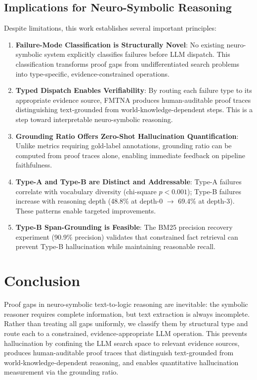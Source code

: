 \documentclass[11pt,letterpaper]{article}
\begin{document}
\subsection{Implications for Neuro-Symbolic Reasoning}

Despite limitations, this work establishes several important principles:

\begin{enumerate}
  \item \textbf{Failure-Mode Classification is Structurally Novel}: No existing neuro-symbolic system explicitly classifies failures before LLM dispatch. This classification transforms proof gaps from undifferentiated search problems into type-specific, evidence-constrained operations.

  \item \textbf{Typed Dispatch Enables Verifiability}: By routing each failure type to its appropriate evidence source, FMTNA produces human-auditable proof traces distinguishing text-grounded from world-knowledge-dependent steps. This is a step toward interpretable neuro-symbolic reasoning.

  \item \textbf{Grounding Ratio Offers Zero-Shot Hallucination Quantification}: Unlike metrics requiring gold-label annotations, grounding ratio can be computed from proof traces alone, enabling immediate feedback on pipeline faithfulness.

  \item \textbf{Type-A and Type-B are Distinct and Addressable}: Type-A failures correlate with vocabulary diversity (chi-square $p{<}0.001$); Type-B failures increase with reasoning depth (48.8\% at depth-0 $\to$ 69.4\% at depth-3). These patterns enable targeted improvements.

  \item \textbf{Type-B Span-Grounding is Feasible}: The BM25 precision recovery experiment (90.9\% precision) validates that constrained fact retrieval can prevent Type-B hallucination while maintaining reasonable recall.
\end{enumerate}

\section{Conclusion}

Proof gaps in neuro-symbolic text-to-logic reasoning are inevitable: the symbolic reasoner requires complete information, but text extraction is always incomplete. Rather than treating all gaps uniformly, we classify them by structural type and route each to a constrained, evidence-appropriate LLM operation. This prevents hallucination by confining the LLM search space to relevant evidence sources, produces human-auditable proof traces that distinguish text-grounded from world-knowledge-dependent reasoning, and enables quantitative hallucination measurement via the grounding ratio.
\end{document}
